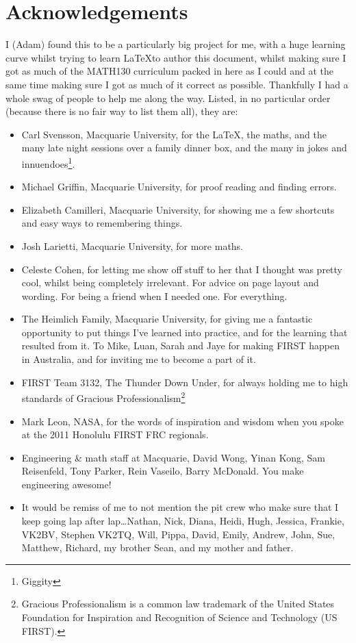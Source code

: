 \section{Acknowledgements}
\label{sec:Acknowledgements}
I (Adam) found this to be a particularly big project for me, with a huge
learning curve whilst trying to learn \LaTeX to author this document, whilst
making sure I got as much of the MATH130 curriculum packed in here as I could
and at the same time making sure I got as much of it correct as possible.
Thankfully I had a whole swag of people to help me along the way. Listed, in no
particular order (because there is no fair way to list them all), they are:
\begin{itemize}
  \item Carl Svensson, Macquarie University, for the \LaTeX, the maths, and the
  many late night sessions over a family dinner box, and the many in jokes and
  innuendoes\footnote{Giggity}.
  \item Michael Griffin, Macquarie University, for proof reading and finding
  errors.
  \item Elizabeth Camilleri, Macquarie University, for showing me a few
  shortcuts and easy ways to remembering things.
  \item Josh Larietti, Macquarie University, for more maths.
  \item Celeste Cohen, for letting me show off stuff to her that I thought
  was pretty cool, whilst being completely irrelevant. For advice on page
  layout and wording. For being a friend when I needed one. For everything.
  \item The Heimlich Family, Macquarie University, for giving me a fantastic
  opportunity to put things I've learned into practice, and for the learning
  that resulted from it. To Mike, Luan, Sarah and Jaye for making FIRST happen
  in Australia, and for inviting me to become a part of it.
  \item FIRST Team 3132, The Thunder Down Under, for always holding me to high
  standards of Gracious Professionalism\texttrademark\footnote{Gracious
  Professionalism is a common law trademark of the United States Foundation for
  Inspiration and Recognition of Science and Technology (US FIRST).}
  \item Mark Leon, NASA, for the words of inspiration and wisdom when you
  spoke at the 2011 Honolulu FIRST FRC regionals. 
  \item Engineering \& math staff at Macquarie, David Wong, Yinan Kong, Sam
  Reisenfeld, Tony Parker, Rein Vaseilo, Barry McDonald. You make engineering
  awesome!
  \item It would be remiss of me to not mention the pit crew who make
  sure that I keep going lap after lap\ldots Nathan, Nick, Diana, Heidi, Hugh,
  Jessica, Frankie, VK2BV, Stephen VK2TQ, Will, Pippa, David, Emily, Andrew,
  John, Sue, Matthew, Richard, my brother Sean, and my mother and father.
\end{itemize}


%
